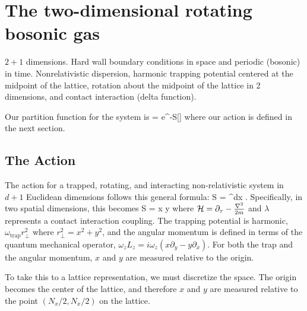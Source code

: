 \documentclass[../../RotatingBosons.tex]{subfiles}
\begin{document}
\section{The two-dimensional rotating bosonic gas}
$2+1$ dimensions. Hard wall boundary conditions in space and periodic (bosonic) in time. Nonrelativistic dispersion, harmonic trapping potential centered at the midpoint of the lattice, rotation about the midpoint of the lattice in 2 dimensions, and contact interaction (delta function).

Our partition function for the system is 
%
\beq
\CZ = \int \dif \phi e^{-S[\phi]}
\eeq
%
where our action is defined in the next section.
\subsection{The Action}
The action for a trapped, rotating, and interacting non-relativistic system in $d+1$ Euclidean dimensions follows this general formula:
%
\beq
S = \int \dif^{d}x \dif\tau {}.
\eeq 
%
Specifically, in two spatial dimensions, this becomes
%
\beq
S = \int \dif x \dif y \dif \tau {}
\eeq 
%
where ${\mathcal H} = \partial_{\tau} - \frac{{\nabla}^{2}}{2m} $ and $\lambda$ represents a contact interaction coupling. The trapping potential is harmonic, $\omega_{\text{trap}}r_{\perp}^{2}$ where $r_{\perp}^{2} = x^{2} + y^{2}$, and the angular momentum is defined in terms of the quantum mechanical operator, $\omega_{z}L_{z} = i \omega_{z}(x \partial_{y} - y\partial_{x})$. For both the trap and the angular momentum, $x$ and $y$ are measured relative to the origin.

To take this to a lattice representation, we must discretize the space. The origin becomes the center of the lattice, and therefore $x$ and $y$ are measured relative to the point $(N_{x}/2, N_{x}/2)$ on the lattice.
\end{document}
